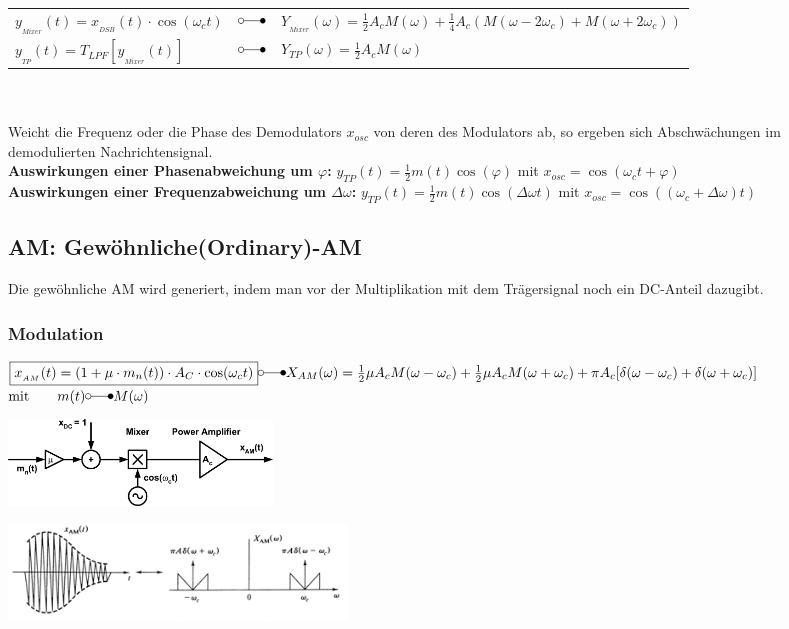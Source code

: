 \begin{tabular}{l l l}
	$y_{_{Mixer}}(t) = x_{_{DSB}}(t) \cdot \cos(\omega_ct)$ & $\laplace$ &  
	$Y_{_{Mixer}}(\omega) = \frac{1}{2} A_c M(\omega) + \frac{1}{4} A_c (M(\omega-2\omega_c) + M(\omega+2\omega_c))$ \\
	$y_{_{TP}}(t) = T_{LPF}[y_{_{Mixer}}(t)] $&$ \laplace $&$ Y_{TP}(\omega) = \frac{1}{2}A_cM(\omega)$ \\
\end{tabular} \\ \\

	Weicht die Frequenz oder die Phase des Demodulators $x_{osc}$ von deren des Modulators ab, 
	so ergeben sich Abschwächungen im demodulierten Nachrichtensignal.\\
\textbf{Auswirkungen einer Phasenabweichung um $\varphi$:} $\boxed{y_{TP}(t) = \frac{1}{2} m(t) \cos(\varphi)} $ mit $x_{osc} = \cos(\omega_c t + \varphi)$ \\
\textbf{Auswirkungen einer Frequenzabweichung um $\Delta \omega$:} $ \boxed{y_{TP}(t) =
\frac{1}{2} m(t) \cos(\Delta \omega t)}$ mit $x_{osc} = \cos((\omega_c + \Delta \omega)t )$ \\

\newpage

\subsection{AM: Gewöhnliche(Ordinary)-AM }
	Die gewöhnliche AM wird generiert, indem man vor der Multiplikation mit dem Trägersignal noch ein DC-Anteil dazugibt.

\subsubsection{Modulation}
	$\boxed{x_{_{AM}}(t) = (1 + \mu \cdot m_n(t)) \cdot A_C \cdot  \cos(\omega_c t)}
	\laplace X_{AM}(\omega) = \frac{1}{2} \mu A_c M(\omega - \omega_c) + 
	\frac{1}{2} \mu A_c M(\omega + \omega_c) + \pi A_c [\delta (\omega - \omega_c) + 
	\delta (\omega + \omega_c)] $ \\
	$ \text{mit} \qquad m(t) \laplace M(\omega) $ \\
	
\begin{minipage}[]{9cm}
	\includegraphics[width=7cm]{bilder/am_oam_modulation.png}
\end{minipage}
\begin{minipage}[]{9cm}
    \includegraphics[width=9cm]{bilder/am_oam_spektrum.png}
\end{minipage}\\

